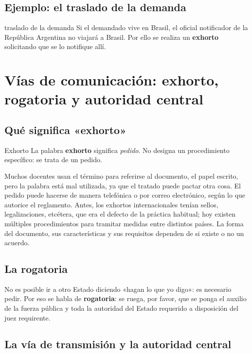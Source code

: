 \documentclass[12pt,oneside]{book}
\begin{document}
\subsection{Ejemplo: el traslado de la demanda}

\begin{example}{traslado de la demanda}
Si el demandado vive en Brasil, el oficial notificador de la República Argentina no viajará a Brasil. Por ello se realiza un \textbf{exhorto} solicitando que se lo notifique allí.
\end{example}

\section{Vías de comunicación: exhorto, rogatoria y autoridad central}

\subsection{Qué significa «exhorto»}

\begin{definition}{Exhorto}
La palabra \textbf{exhorto} significa \textit{pedido}. No designa un procedimiento específico: se trata de un pedido.
\end{definition}

Muchos docentes usan el término para referirse al documento, el papel escrito, pero la palabra está mal utilizada, ya que el tratado puede pactar otra cosa. El pedido puede hacerse de manera telefónica o por correo electrónico, según lo que autorice el reglamento. Antes, los exhortos internacionales tenían sellos, legalizaciones, etcétera, que era el defecto de la práctica habitual; hoy existen múltiples procedimientos para tramitar medidas entre distintos países. La forma del documento, sus características y sus requisitos dependen de si existe o no un acuerdo.

\subsection{La rogatoria}

No es posible ir a otro Estado diciendo «hagan lo que yo digo»: es necesario pedir. Por eso se habla de \textbf{rogatoria}: se ruega, por favor, que se ponga el auxilio de la fuerza pública y toda la autoridad del Estado requerido a disposición del juez requirente.

\subsection{La vía de transmisión y la autoridad central}
\end{document}

